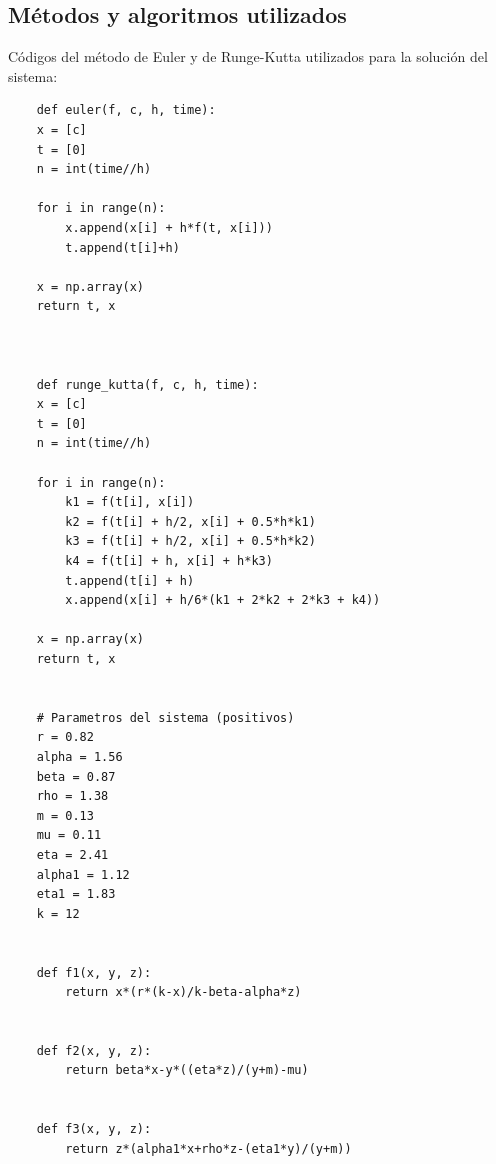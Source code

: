 \documentclass{wscpaperproc}
\theoremstyle{wsc}
\begin{document}
\FloatBarrier
\subsection{M\'etodos y algoritmos utilizados}
Códigos del método de Euler y de Runge-Kutta utilizados para la solución del sistema:\\
\begin{verbatim}
	def euler(f, c, h, time):
    x = [c]
    t = [0]
    n = int(time//h)

    for i in range(n):
        x.append(x[i] + h*f(t, x[i]))
        t.append(t[i]+h)
    
    x = np.array(x)
    return t, x


	
	def runge_kutta(f, c, h, time):
    x = [c]
    t = [0]
    n = int(time//h)
    
    for i in range(n):
        k1 = f(t[i], x[i])
        k2 = f(t[i] + h/2, x[i] + 0.5*h*k1)
        k3 = f(t[i] + h/2, x[i] + 0.5*h*k2)
        k4 = f(t[i] + h, x[i] + h*k3)
        t.append(t[i] + h)
        x.append(x[i] + h/6*(k1 + 2*k2 + 2*k3 + k4))

    x = np.array(x)
    return t, x
	
	
	# Parametros del sistema (positivos)
	r = 0.82
	alpha = 1.56
	beta = 0.87
	rho = 1.38
	m = 0.13
	mu = 0.11
	eta = 2.41
	alpha1 = 1.12
	eta1 = 1.83
	k = 12
	
	
	def f1(x, y, z):
		return x*(r*(k-x)/k-beta-alpha*z)
	
	
	def f2(x, y, z):
		return beta*x-y*((eta*z)/(y+m)-mu)
	
	
	def f3(x, y, z):
		return z*(alpha1*x+rho*z-(eta1*y)/(y+m))
	
\end{verbatim}
\end{document}
